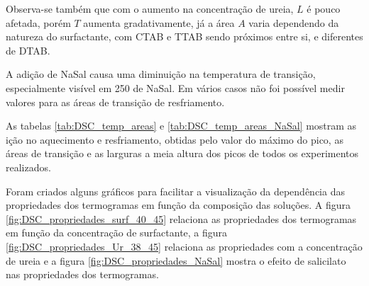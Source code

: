 	Observa-se também que com o aumento na concentração de ureia, $L$ é pouco afetada, porém $T$ aumenta gradativamente, já a área $A$ varia dependendo da natureza do surfactante, com CTAB e TTAB sendo próximos entre si, e diferentes de DTAB.
	
	A adição de NaSal causa uma diminuição na temperatura de transição, especialmente visível em 250\mM{} de NaSal. Em vários casos não foi possível medir valores para as áreas de transição de resfriamento.
	
	As tabelas \ref{tab:DSC_temp_areas} e \ref{tab:DSC_temp_areas_NaSal} mostram as ição no aquecimento e resfriamento, obtidas pelo valor do máximo do pico, as áreas de transição e as larguras a meia altura dos picos de todos os experimentos realizados.
	
	Foram criados alguns gráficos para facilitar a visualização da dependência das propriedades dos termogramas em função da composição das soluções. A figura \ref{fig:DSC_propriedades_surf_40_45} relaciona as propriedades dos termogramas em função da concentração de surfactante, a figura \ref{fig:DSC_propriedades_Ur_38_45} relaciona as propriedades com a concentração de ureia e a figura \ref{fig:DSC_propriedades_NaSal} mostra o efeito de salicilato nas propriedades dos termogramas.
	
	
